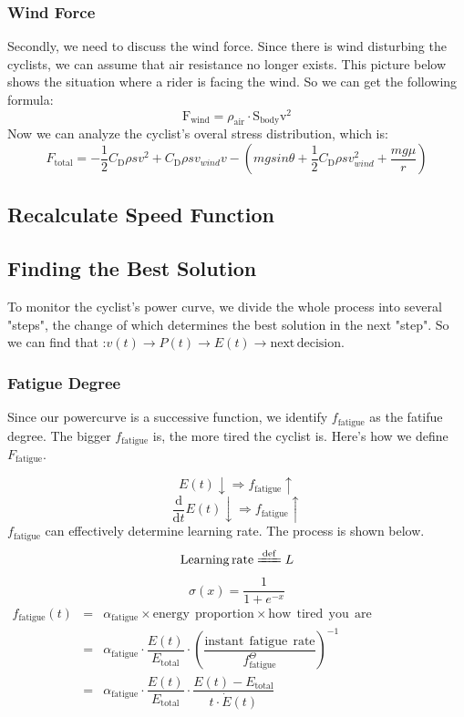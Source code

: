 \documentclass[12pt]{article}
\theoremstyle{definition}
\theoremstyle{remark}
\numberwithin{equation}{section}
\begin{document}
	\subsubsection{Wind Force}
	Secondly, we need to discuss the wind force. Since there is wind disturbing the cyclists, we can assume that air resistance no longer exists. This picture below shows the situation where a rider is facing the wind. So we can get the following formula:
	$$\mathrm{F}_\mathrm{wind}=\rho_\mathrm{air}\cdot\mathrm{S}_\mathrm{body}\mathrm{v}^2$$
	Now we can analyze the cyclist's overal stress distribution, which is:
	$$F_\mathrm{total}=-\frac{1}{2}C_\mathrm{D}\rho sv^2+C_\mathrm{D}\rho sv_{wind}v-(mgsin\theta+\frac{1}{2}C_\mathrm{D}\rho sv_{wind}^2+\frac{mg\mu}{r})$$
	\subsection{Recalculate Speed Function}
	\subsection{Finding the Best Solution}
	To monitor the cyclist's power curve, we divide the whole process into several "steps", the change of which determines the best solution in the next "step". So we can find that :$v(t)\rightarrow P(t)\rightarrow E(t)\rightarrow \mathrm{next\, decision}$.
	\subsubsection{Fatigue Degree}
	Since our powercurve is a successive function, we identify $f_{\mathrm{fatigue}}$ as the fatifue degree. The bigger $f_{\mathrm{fatigue}}$ is, the more tired the cyclist is. Here's how we define $F_\mathrm{fatigue}$.

	$$E(t)\downarrow\Rightarrow f_{\mathrm{fatigue}}\uparrow$$
    $$\dfrac{\mathrm{d}}{\mathrm{d}t}E(t)\downarrow\Rightarrow f_{\mathrm{fatigue}}\uparrow$$
	$f_\mathrm{fatigue}$ can effectively determine learning rate.
	 The process is shown below.
  	$$\mathrm{Learning\,rate}\xlongequal{\mathrm{def}}L$$
    $$\sigma \left( x \right) =\dfrac{1}{1+e^{-x}}$$
    $\begin{array}{ccc}
		f_\mathrm{fatigue}\left(t\right)&=&\alpha_{\mathrm{fatigue}}\times \mathrm{energy}\:\:\mathrm{proportion}\times \mathrm{how}\:\:\mathrm{tired}\:\:\mathrm{you}\:\:\mathrm{are}\\  
     	\ &=&\alpha_\mathrm{fatigue}\cdot \dfrac{E(t)}{E_\mathrm{total}}\cdot \left( \dfrac{\mathrm{instant}\:\:\mathrm{fatigue}\:\:\mathrm{rate}}{f_\mathrm{fatigue}^{\Theta}}\right)^{-1}\\
    	\ &=&\alpha_{\mathrm{fatigue}}\cdot \dfrac{E\left( t \right)}{E_{\mathrm{total}}}\cdot \dfrac{E\left( t \right) -E_{\mathrm{total}}}{t\cdot \dot{E}\left( t \right)}\\
	\end{array}$
\end{document}
